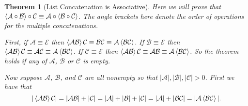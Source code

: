 \documentclass[12pt]{article}
\theoremstyle{break}
\theoremstyle{break}
\newtheorem{theorem}{Theorem}[section]
\theoremstyle{break}
\theoremstyle{break}
\newcommand{\mc}[1]{\mathcal{#1}}
\begin{document}
\begin{theorem}[List Concatenation is Associative]
\label{thm:concatassoc}
Here we will prove that $\Braket{\mc{A}\circ \mc{B}}\circ \mc{C} \equiv \mc{A} \circ \Braket{\mc{B} \circ \mc{C}}$.
The angle brackets here denote the order of operations for the multiple concatenations.

First, if $\mc{A} \equiv \mc{E}$ then $\Braket{\mc{A}\mc{B}}\mc{C} \equiv \mc{B}\mc{C} \equiv \mc{A}\Braket{\mc{B}\mc{C}}$. 
If $\mc{B}\equiv \mc{E}$ then $\Braket{\mc{A}\mc{B}}\mc{C} \equiv \mc{A}\mc{C} \equiv \mc{A}\Braket{\mc{B}\mc{C}}$. 
If $\mc{C}\equiv \mc{E}$ then $\Braket{\mc{A}\mc{B}}\mc{C} \equiv \mc{A}\mc{B} \equiv \mc{A}\Braket{\mc{B}\mc{C}}$. So the theorem holds if any of $\mc{A}$, $\mc{B}$ or $\mc{C}$ is empty.

Now suppose $\mc{A}$, $\mc{B}$, and $\mc{C}$ are all nonempty so that $|\mc{A}|, |\mc{B}|, |\mc{C}| > 0$.
First we have that
$$
|\Braket{\mc{A}\mc{B}}\mc{C}| = |\mc{A}\mc{B}| + |\mc{C}| = |\mc{A}| + |\mc{B}| + |\mc{C}| = |\mc{A}| + |\mc{B}\mc{C}| = |\mc{A}\Braket{\mc{B}\mc{C}}|.
$$


\end{theorem}
\end{document}
